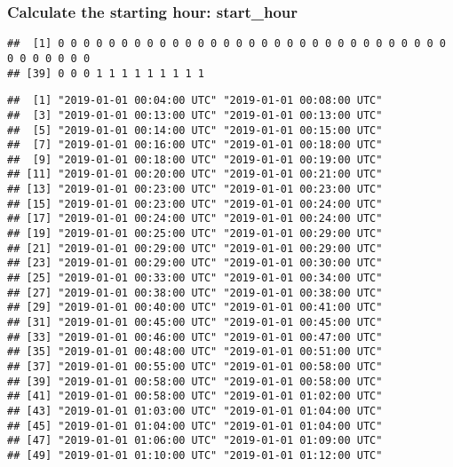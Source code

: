 \documentclass[
]{article}
\newenvironment{Shaded}{\begin{snugshade}}{\end{snugshade}}
\newcommand{\DecValTok}[1]{\textcolor[rgb]{0.00,0.00,0.81}{#1}}
\newcommand{\FunctionTok}[1]{\textcolor[rgb]{0.13,0.29,0.53}{\textbf{#1}}}
\newcommand{\NormalTok}[1]{#1}
\newcommand{\SpecialCharTok}[1]{\textcolor[rgb]{0.81,0.36,0.00}{\textbf{#1}}}
\begin{document}
\hypertarget{calculate-the-starting-hour-start_hour}{%
\subsubsection{Calculate the starting hour:
start\_hour}\label{calculate-the-starting-hour-start_hour}}

\begin{Shaded}
\end{Shaded}

\begin{verbatim}
##  [1] 0 0 0 0 0 0 0 0 0 0 0 0 0 0 0 0 0 0 0 0 0 0 0 0 0 0 0 0 0 0 0 0 0 0 0 0 0 0
## [39] 0 0 0 1 1 1 1 1 1 1 1 1
\end{verbatim}

\begin{Shaded}
\end{Shaded}

\begin{verbatim}
##  [1] "2019-01-01 00:04:00 UTC" "2019-01-01 00:08:00 UTC"
##  [3] "2019-01-01 00:13:00 UTC" "2019-01-01 00:13:00 UTC"
##  [5] "2019-01-01 00:14:00 UTC" "2019-01-01 00:15:00 UTC"
##  [7] "2019-01-01 00:16:00 UTC" "2019-01-01 00:18:00 UTC"
##  [9] "2019-01-01 00:18:00 UTC" "2019-01-01 00:19:00 UTC"
## [11] "2019-01-01 00:20:00 UTC" "2019-01-01 00:21:00 UTC"
## [13] "2019-01-01 00:23:00 UTC" "2019-01-01 00:23:00 UTC"
## [15] "2019-01-01 00:23:00 UTC" "2019-01-01 00:24:00 UTC"
## [17] "2019-01-01 00:24:00 UTC" "2019-01-01 00:24:00 UTC"
## [19] "2019-01-01 00:25:00 UTC" "2019-01-01 00:29:00 UTC"
## [21] "2019-01-01 00:29:00 UTC" "2019-01-01 00:29:00 UTC"
## [23] "2019-01-01 00:29:00 UTC" "2019-01-01 00:30:00 UTC"
## [25] "2019-01-01 00:33:00 UTC" "2019-01-01 00:34:00 UTC"
## [27] "2019-01-01 00:38:00 UTC" "2019-01-01 00:38:00 UTC"
## [29] "2019-01-01 00:40:00 UTC" "2019-01-01 00:41:00 UTC"
## [31] "2019-01-01 00:45:00 UTC" "2019-01-01 00:45:00 UTC"
## [33] "2019-01-01 00:46:00 UTC" "2019-01-01 00:47:00 UTC"
## [35] "2019-01-01 00:48:00 UTC" "2019-01-01 00:51:00 UTC"
## [37] "2019-01-01 00:55:00 UTC" "2019-01-01 00:58:00 UTC"
## [39] "2019-01-01 00:58:00 UTC" "2019-01-01 00:58:00 UTC"
## [41] "2019-01-01 00:58:00 UTC" "2019-01-01 01:02:00 UTC"
## [43] "2019-01-01 01:03:00 UTC" "2019-01-01 01:04:00 UTC"
## [45] "2019-01-01 01:04:00 UTC" "2019-01-01 01:04:00 UTC"
## [47] "2019-01-01 01:06:00 UTC" "2019-01-01 01:09:00 UTC"
## [49] "2019-01-01 01:10:00 UTC" "2019-01-01 01:12:00 UTC"
\end{verbatim}
\end{document}
